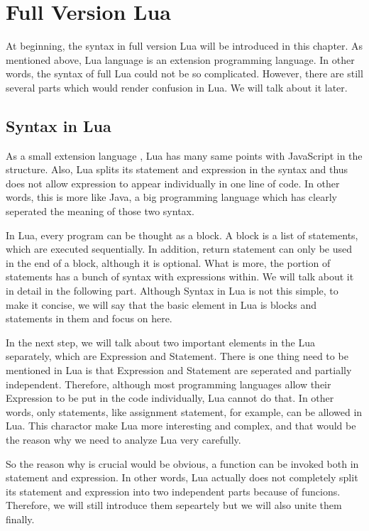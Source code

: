 \chapter{Full Version Lua}
At beginning, the syntax in full version Lua will be introduced in this chapter. As mentioned above, Lua language is an extension programming language. In other words, the syntax of full Lua could not be so complicated. However, there are still several parts which would render confusion in Lua. We will talk about it later.  

\section{Syntax in Lua}
As a small extension language \cite{PIL}, Lua has many same points with JavaScript in the structure. Also, Lua splits its statement and expression in the syntax and thus does not allow expression to appear individually in one line of code. In other words, this is more like Java, a big programming language which has clearly seperated the meaning of those two syntax.

In Lua, every program can be thought as a block. A block is a list of statements, which are executed sequentially. In addition, return statement can only be used in the end of a block, although it is optional. What is more, the portion of statements has a bunch of syntax with expressions within. We will talk about it in detail in the following part. Although Syntax in Lua is not this simple, to make it concise, we will say that the basic element in Lua is blocks and statements in them and focus on here.

In the next step, we will talk about two important elements in the Lua separately, which are Expression and Statement. There is one thing need to be mentioned in Lua is that Expression and Statement are seperated and partially independent. Therefore, although most programming languages allow their Expression to be put in the code individually, Lua cannot do that. In other words, only statements, like assignment statement, for example, can be allowed in Lua. This charactor make Lua more interesting and complex, and that would be the reason why we need to analyze Lua very carefully.

So the reason why is crucial would be obvious, a function can be invoked both in statement and expression. In other words, Lua actually does not completely split its statement and expression into two independent parts because of funcions. Therefore, we will still introduce them sepeartely but we will also unite them finally.

